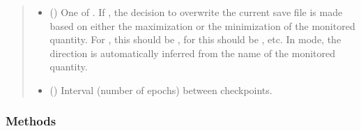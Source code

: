 \documentclass[letterpaper,10pt,english]{sphinxmanual}
\begin{document}
\begin{fulllineitems}
\begin{quote}
\begin{description}
\begin{itemize}
\item {} 
 () \textendash{} One of . If , the decision
to overwrite the current save file is made based on either the
maximization or the minimization of the monitored quantity. For
, this should be , for  this should
be , etc. In  mode, the direction is automatically
inferred from the name of the monitored quantity.

\item {} 
 () \textendash{} Interval (number of epochs) between checkpoints.

\end{itemize}

\end{description}\end{quote}
\subsubsection*{Methods}


\begin{savenotes}\sphinxatlongtablestart\begin{longtable}[c]{}
\hline

\endfirsthead

%
{}\\
\hline

\endhead

\hline
{}\\
\endfoot

\endlastfoot


\end{longtable}
\end{savenotes}
\end{fulllineitems}
\end{document}
